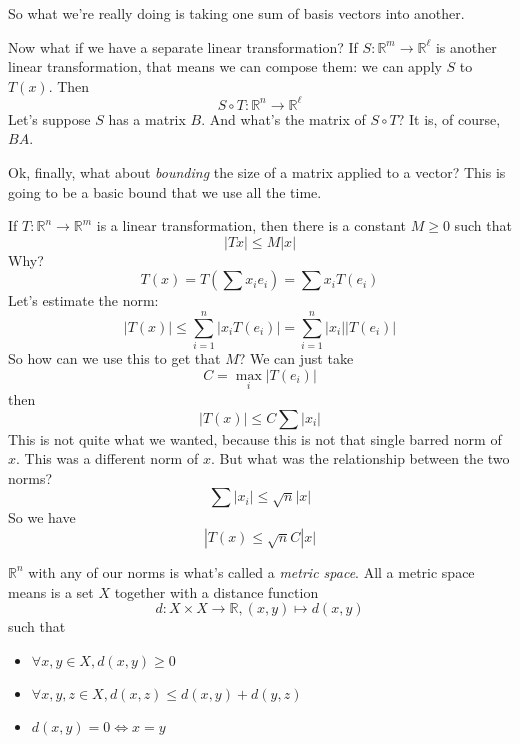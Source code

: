 \documentclass{article}
\newcommand{\reals}[0]{\mathbb{R}}
\begin{document}
So what we're really doing is taking one sum of basis vectors into another.

Now what if we have a separate linear transformation? If \(S: \reals^m \to \reals^\ell\) is another linear transformation, that means we can compose them: we can apply \(S\) to \(T(x)\). Then
\begin{equation}S \circ T: \reals^n \to \reals^\ell\end{equation}
Let's suppose \(S\) has a matrix \(B\). And what's the matrix of \(S \circ T\)? It is, of course, \(BA\).

Ok, finally, what about \textit{bounding} the size of a matrix applied to a vector? This is going to be a basic bound that we use all the time.

If \(T: \reals^n \to \reals^m\) is a linear transformation, then there is a constant \(M \geq 0\) such that
\begin{equation}|Tx| \leq M|x|\end{equation}
Why?
\begin{equation}T(x) = T\left(\sum x_ie_i\right) = \sum x_iT(e_i)\end{equation}
Let's estimate the norm:
\begin{equation}|T(x)| \leq \sum_{i = 1}^n|x_iT(e_i)| = \sum_{i = 1}^n|x_i||T(e_i)|\end{equation}
So how can we use this to get that \(M\)? We can just take
\begin{equation}C = \max_{i}|T(e_i)|\end{equation}
then
\begin{equation}|T(x)| \leq C\sum|x_i|\end{equation}
This is not quite what we wanted, because this is not that single barred norm of \(x\). This was a different norm of \(x\). But what was the relationship between the two norms?
\begin{equation}\sum|x_i| \leq \sqrt{n}|x|\end{equation}
So we have
\begin{equation}|T(x) \leq \sqrt{n}C|x|\end{equation}

\(\reals^n\) with any of our norms is what's called a \textit{metric space}. All a metric space means is a set \(X\) together with a distance function
\begin{equation}d: X \times X \to \reals, (x, y) \mapsto d(x, y)\end{equation}
such that
\begin{itemize}
  \item \(\forall x, y \in X, d(x, y) \geq 0\)
  \item \(\forall x, y, z \in X, d(x, z) \leq d(x, y) + d(y, z)\)
  \item \(d(x, y) = 0 \iff x = y\)
\end{itemize}
\end{document}
